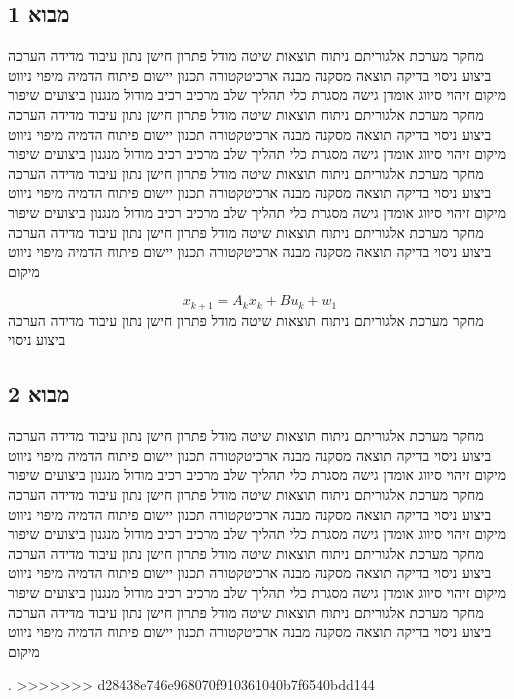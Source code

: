\subsection{מבוא 1}
\label{sub:ch01_1}
מחקר מערכת אלגוריתם ניתוח תוצאות שיטה מודל פתרון חישן נתון עיבוד מדידה הערכה ביצוע ניסוי בדיקה תוצאה מסקנה מבנה ארכיטקטורה תכנון יישום פיתוח הדמיה מיפוי ניווט מיקום זיהוי סיווג אומדן גישה מסגרת כלי תהליך שלב מרכיב רכיב מודול מנגנון ביצועים שיפור מחקר מערכת אלגוריתם ניתוח תוצאות שיטה מודל פתרון חישן נתון עיבוד מדידה הערכה ביצוע ניסוי בדיקה תוצאה מסקנה מבנה ארכיטקטורה תכנון יישום פיתוח הדמיה מיפוי ניווט מיקום זיהוי סיווג אומדן גישה מסגרת כלי תהליך שלב מרכיב רכיב מודול מנגנון ביצועים שיפור מחקר מערכת אלגוריתם ניתוח תוצאות שיטה מודל פתרון חישן נתון עיבוד מדידה הערכה ביצוע ניסוי בדיקה תוצאה מסקנה מבנה ארכיטקטורה תכנון יישום פיתוח הדמיה מיפוי ניווט מיקום זיהוי סיווג אומדן גישה מסגרת כלי תהליך שלב מרכיב רכיב מודול מנגנון ביצועים שיפור מחקר מערכת אלגוריתם ניתוח תוצאות שיטה מודל פתרון חישן נתון עיבוד מדידה הערכה ביצוע ניסוי בדיקה תוצאה מסקנה מבנה ארכיטקטורה תכנון יישום פיתוח הדמיה מיפוי ניווט מיקום

\begin{equation}
    x_{k+1} = A_{k} x_k + B u_{k} + w_{1}
    \label{eq:ch01_1}
\end{equation}
מחקר מערכת אלגוריתם ניתוח תוצאות שיטה מודל פתרון חישן נתון עיבוד מדידה הערכה ביצוע ניסוי

\subsection{מבוא 2}
\label{sub:ch01_2}
מחקר מערכת אלגוריתם ניתוח תוצאות שיטה מודל פתרון חישן נתון עיבוד מדידה הערכה ביצוע ניסוי בדיקה תוצאה מסקנה מבנה ארכיטקטורה תכנון יישום פיתוח הדמיה מיפוי ניווט מיקום זיהוי סיווג אומדן גישה מסגרת כלי תהליך שלב מרכיב רכיב מודול מנגנון ביצועים שיפור מחקר מערכת אלגוריתם ניתוח תוצאות שיטה מודל פתרון חישן נתון עיבוד מדידה הערכה ביצוע ניסוי בדיקה תוצאה מסקנה מבנה ארכיטקטורה תכנון יישום פיתוח הדמיה מיפוי ניווט מיקום זיהוי סיווג אומדן גישה מסגרת כלי תהליך שלב מרכיב רכיב מודול מנגנון ביצועים שיפור מחקר מערכת אלגוריתם ניתוח תוצאות שיטה מודל פתרון חישן נתון עיבוד מדידה הערכה ביצוע ניסוי בדיקה תוצאה מסקנה מבנה ארכיטקטורה תכנון יישום פיתוח הדמיה מיפוי ניווט מיקום זיהוי סיווג אומדן גישה מסגרת כלי תהליך שלב מרכיב רכיב מודול מנגנון ביצועים שיפור מחקר מערכת אלגוריתם ניתוח תוצאות שיטה מודל פתרון חישן נתון עיבוד מדידה הערכה ביצוע ניסוי בדיקה תוצאה מסקנה מבנה ארכיטקטורה תכנון יישום פיתוח הדמיה מיפוי ניווט מיקום

 \cite{Thrun2005}\cite{Kalman1960}.
>>>>>>> d28438e746e968070f910361040b7f6540bdd144
